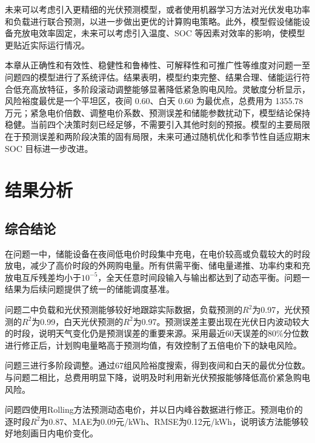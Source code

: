 \documentclass[UTF8]{ctexart}
\begin{document}
    未来可以考虑引入更精细的光伏预测模型，或者使用机器学习方法对光伏发电功率和负载进行联合预测，以进一步做出更优的计算购电策略。此外，模型假设储能设备充放电效率固定，未来可以考虑引入温度、SOC 等因素对效率的影响，使模型更贴近实际运行情况。\par
    
    本章从正确性和有效性、稳健性和鲁棒性、可解释性和可推广性等维度对问题一至问题四的模型进行了系统评估。结果表明，模型约束完整、结果合理、储能运行符合低充高放特征，多阶段滚动调整能够显著降低紧急购电风险。灵敏度分析显示，风险裕度最优是一个平坦区，夜间 0.60、白天 0.60 为最优点，总费用为 1355.78 万元；紧急电价倍数、调整电价系数、预测误差和储能参数扰动下，模型结论保持稳健。当前四个决策时刻已经足够，不需要引入其他时刻的预报。模型的主要局限在于预测误差和两阶段决策的固有局限，未来可通过随机优化和季节性自适应期末 SOC 目标进一步改进。\par
    
    \section{结果分析}
    
    \subsection{综合结论}
    
    在问题一中，储能设备在夜间低电价时段集中充电，在电价较高或负载较大的时段放电，减少了高价时段的外网购电量。所有供需平衡、储电量递推、功率约束和充放电互斥残差均小于$10^{-5}$，全天任意时间段输入与输出都达到了动态平衡。问题一结果为后续问题提供了统一的储能调度基准。\par
    
    问题二中负载和光伏预测能够较好地跟踪实际数据，负载预测的$R^2$为0.97，光伏预测的$R^2$为0.99，白天光伏预测的$R^2$为0.97。预测误差主要出现在光伏日内波动较大的时段，说明天气变化仍是预测误差的重要来源。采用最近60天误差的80\%分位数进行修正后，计划购电量略高于预测均值，有效控制了五倍电价下的缺电风险。\par
    
    问题三进行多阶段调整。通过67组风险裕度搜索，得到夜间和白天的最优分位数。与问题二相比，总费用明显下降，说明及时利用新光伏预报能够降低高价紧急购电风险。\par
    
    问题四使用Rolling方法预测动态电价，并以日内峰谷数据进行修正。预测电价的逐时段$R^2$为0.87、MAE为0.09元/kWh、RMSE为0.12元/kWh，说明该方法能够较好地刻画日内电价变化。\par
    
\end{document}
